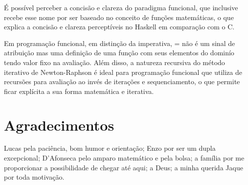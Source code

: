\documentclass{pssbmac}
\begin{document}
É possível perceber a concisão e clareza do paradigma funcional, que inclusive recebe esse nome por ser baseado no conceito de funções matemáticas, o que explica a concisão e clareza perceptíveis no Haskell em comparação com o C. 

Em programação funcional, em distinção da imperativa, = não é um sinal de atribuição mas uma definição de uma função com seus elementos do dominío tendo valor fixo na avaliação. Além disso, a natureza recursiva do método iterativo de Newton-Raphson é ideal para programação funcional que utiliza de recursões para avaliação ao invés de iterações e sequenciamento, o que permite ficar explícita a sua forma matemática e iterativa.

\section*{Agradecimentos}
Lucas pela paciência, bom humor e orientação; Enzo por ser um dupla excepcional; D'Afonseca pelo amparo matemático e pela bolsa; a família por me proporcionar a possibilidade de chegar até aqui; a Deus; a minha querida Jaque por toda motivação.


\printbibliography
\end{document}
